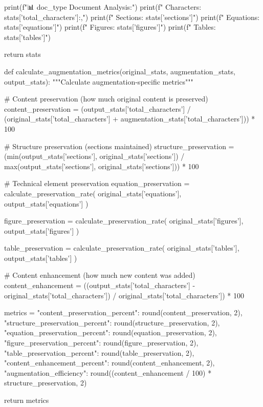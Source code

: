     print(f"📊 {doc_type} Document Analysis:")
    print(f"  Characters: {stats['total_characters']:,}")
    print(f"  Sections: {stats['sections']}")
    print(f"  Equations: {stats['equations']}")
    print(f"  Figures: {stats['figures']}")
    print(f"  Tables: {stats['tables']}")
    
    return stats

def calculate_augmentation_metrics(original_stats, augmentation_stats, output_stats):
    """Calculate augmentation-specific metrics"""
    
    # Content preservation (how much original content is preserved)
    content_preservation = (output_stats['total_characters'] / 
                          (original_stats['total_characters'] + augmentation_stats['total_characters'])) * 100
    
    # Structure preservation (sections maintained)
    structure_preservation = (min(output_stats['sections'], original_stats['sections']) / 
                            max(output_stats['sections'], original_stats['sections'])) * 100
    
    # Technical element preservation
    equation_preservation = calculate_preservation_rate(
        original_stats['equations'], output_stats['equations']
    )
    
    figure_preservation = calculate_preservation_rate(
        original_stats['figures'], output_stats['figures']
    )
    
    table_preservation = calculate_preservation_rate(
        original_stats['tables'], output_stats['tables']
    )
    
    # Content enhancement (how much new content was added)
    content_enhancement = ((output_stats['total_characters'] - original_stats['total_characters']) / 
                          original_stats['total_characters']) * 100
    
    metrics = {
        "content_preservation_percent": round(content_preservation, 2),
        "structure_preservation_percent": round(structure_preservation, 2),
        "equation_preservation_percent": round(equation_preservation, 2),
        "figure_preservation_percent": round(figure_preservation, 2),
        "table_preservation_percent": round(table_preservation, 2),
        "content_enhancement_percent": round(content_enhancement, 2),
        "augmentation_efficiency": round((content_enhancement / 100) * structure_preservation, 2)
    }
    
    return metrics

